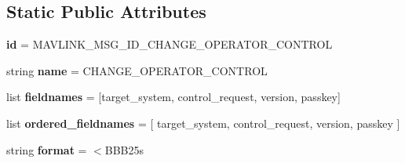 \subsection*{Static Public Attributes}
\begin{DoxyCompactItemize}
\item 
\mbox{\label{classpymavlink_1_1dialects_1_1v10_1_1MAVLink__change__operator__control__message_ad1ea5bcee34aa9dae1c27bd91e0754b2}} 
{\bfseries id} = M\+A\+V\+L\+I\+N\+K\+\_\+\+M\+S\+G\+\_\+\+I\+D\+\_\+\+C\+H\+A\+N\+G\+E\+\_\+\+O\+P\+E\+R\+A\+T\+O\+R\+\_\+\+C\+O\+N\+T\+R\+OL
\item 
\mbox{\label{classpymavlink_1_1dialects_1_1v10_1_1MAVLink__change__operator__control__message_af18c920eb33922a4bc669adeaf0836a3}} 
string {\bfseries name} = \textquotesingle{}C\+H\+A\+N\+G\+E\+\_\+\+O\+P\+E\+R\+A\+T\+O\+R\+\_\+\+C\+O\+N\+T\+R\+OL\textquotesingle{}
\item 
\mbox{\label{classpymavlink_1_1dialects_1_1v10_1_1MAVLink__change__operator__control__message_a26cedef22240794daf775cda63dce60c}} 
list {\bfseries fieldnames} = \mbox{[}\textquotesingle{}target\+\_\+system\textquotesingle{}, \textquotesingle{}control\+\_\+request\textquotesingle{}, \textquotesingle{}version\textquotesingle{}, \textquotesingle{}passkey\textquotesingle{}\mbox{]}
\item 
\mbox{\label{classpymavlink_1_1dialects_1_1v10_1_1MAVLink__change__operator__control__message_ab7ed53767141caa99218d5ce6fb95eaa}} 
list {\bfseries ordered\+\_\+fieldnames} = \mbox{[} \textquotesingle{}target\+\_\+system\textquotesingle{}, \textquotesingle{}control\+\_\+request\textquotesingle{}, \textquotesingle{}version\textquotesingle{}, \textquotesingle{}passkey\textquotesingle{} \mbox{]}
\item 
\mbox{\label{classpymavlink_1_1dialects_1_1v10_1_1MAVLink__change__operator__control__message_ae1ed472b7dc692e14fa0113f13595b68}} 
string {\bfseries format} = \textquotesingle{}$<$B\+B\+B25s\textquotesingle{}

\end{DoxyCompactItemize}
